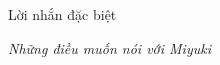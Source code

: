 
\clearpage
\thispagestyle{empty}

\begin{center}
    \vspace*{3cm}
    
    \textcolor{winter_blue}{}
    
    \vspace{1cm}
    
    {\titlefont\LARGE\textcolor{winter_blue}{Lời nhắn đặc biệt}}
    
    \vspace{0.3cm}
    
    {\small\textit{Những điều muốn nói với Miyuki}}
    
    \vspace{1cm}
    
    \textcolor{winter_blue}{}
\end{center}

\clearpage

